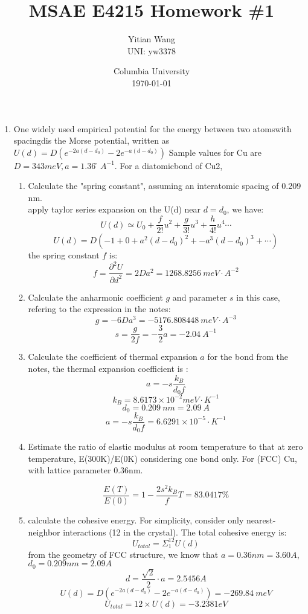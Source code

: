 \documentclass{article}
\title{MSAE E4215 Homework \#1}
\author{Yitian Wang\\UNI: yw3378}
\date{Columbia University \\ \today}
\begin{document}
\maketitle
\begin{enumerate}
\item One widely used empirical potential for the energy between two atomswith spacingdis the Morse potential, 
written as
$U(d) =D(e^{-2a(d - d_0)} - 2e^{ - a(d - d_0)})$
Sample values for Cu are $D= 343 meV, a= 1.36 ̊A^{-1}$.  
For a diatomicbond of Cu2,

\begin{enumerate}[label=(\alph*)]
\item Calculate the "spring constant", assuming an interatomic spacing of 0.209 nm.\\
apply taylor series expansion on the U(d) near $d=d_0$, we have:
$$U(d) \simeq U_{0}+\frac{f}{2 !} u^{2}+\frac{g}{3 !} u^{3}+\frac{h}{4 !} u^{4} \cdots$$
$$U(d)=D(-1 + 0 + a^2(d-d_0)^2 + {-a}^3(d-d_0)^3 + \cdots) $$
the spring constant $f$ is:
$$f=\frac{\partial^2 U}{\partial d^2}=2Da^2 = 1268.8256 \ meV\cdot A^{-2}‬$$

\item Calculate the anharmonic coefficient $g$ and parameter $s$
in this case, refering to the expression in the notes:
$$g=-6Da^3= -5176.808448 \ meV\cdot A^{-3}‬$$
$$s=\frac{g}{2f}=-\frac{3}{2} a = -2.04 \ A^{-1} $$
\item Calculate the coefficient of thermal expansion $a$ for the bond
from the notes, the thermal expansion coefficient is :
$$a= -s \frac{k_B}{d_0 f} $$
$$ k_B=8.6173 \times 10^{-2} meV \cdot K^{-1}$$
$$d_0=0.209\ nm=2.09\ A $$
$$ a= -s \frac{k_B}{d_0 f} =  6.6291 \times 10^{-5}\cdot K^{-1}$$

\item Estimate the ratio of elastic modulus at room temperature to that at zero temperature,
E(300K)/E(0K) considering one bond only. For (FCC) Cu, with lattice parameter 0.36nm.

$$
\frac{E(T)}{E(0)}=1-\frac{2 s^{2} k_{B}}{f} T = 83.0417 \%
$$
\item calculate the cohesive energy. For simplicity, consider only nearest-neighbor interactions (12 in the crystal).
The total cohesive energy is:
$$ U_{total}=\Sigma^{12}_{1} U(d) $$
from the geometry of FCC structure, 
we know that $a=0.36nm=3.60 A $, $d_0=0.209nm=2.09A$
$$ d=\frac{\sqrt{2}}{2} \cdot a = 2.5456 A $$
$$U(d) =D(e^{-2a(d - d_0)} - 2e^{ - a(d - d_0)}) =-269.84\ meV$$
$$U_{total}=12\times U(d)=-3.2381 eV $$
\end{enumerate}



\end{enumerate}
\end{document}
